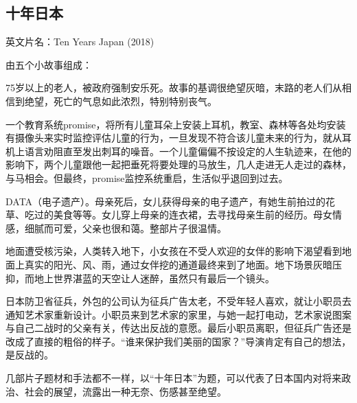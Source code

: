 \subsection{十年日本}

英文片名：Ten Years Japan (2018)

由五个小故事组成：
\begin{itemize*}
	\item 75岁以上的老人，被政府强制安乐死。故事的基调很绝望灰暗，末路的老人们从相信到绝望，死亡的气息如此浓烈，特别特别丧气。
	\item 一个教育系统promise，将所有儿童耳朵上安装上耳机，教室、森林等各处均安装有摄像头来实时监控评估儿童的行为，一旦发现不符合该儿童未来的行为，就从耳机上语言劝阻直至发出刺耳的噪音。一个儿童偏偏不按设定的人生轨迹来，在他的影响下，两个儿童跟他一起把垂死将要处理的马放生，几人走进无人走过的森林，与马相会。但最终，promise监控系统重启，生活似乎退回到过去。
	\item DATA（电子遗产）。母亲死后，女儿获得母亲的电子遗产，有她生前拍过的花草、吃过的美食等等。女儿穿上母亲的连衣裙，去寻找母亲生前的经历。母女情感，细腻而可爱，父亲也很和蔼。整部片子很温情。
	\item 地面遭受核污染，人类转入地下，小女孩在不受人欢迎的女伴的影响下渴望看到地面上真实的阳光、风、雨，通过女伴挖的通道最终来到了地面。地下场景灰暗压抑，而地上世界湛蓝的天空让人迷醉，虽然只有最后一个镜头。
	\item 日本防卫省征兵，外包的公司认为征兵广告太老，不受年轻人喜欢，就让小职员去通知艺术家重新设计。小职员来到艺术家的家里，与她一起打电动，艺术家说图案与自己二战时的父亲有关，传达出反战的意愿。最后小职员离职，但征兵广告还是改成了直接的粗俗的样子。“谁来保护我们美丽的国家？”导演肯定有自己的想法，是反战的。
\end{itemize*}

几部片子题材和手法都不一样，以“十年日本”为题，可以代表了日本国内对将来政治、社会的展望，流露出一种无奈、伤感甚至绝望。